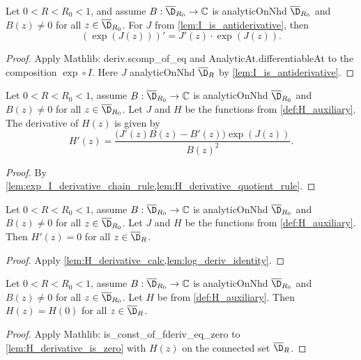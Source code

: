 \begin{lemma}\label{lem:exp_I_derivative_chain_rule}
\leanok
{}
Let $0<R<R_0<1$, and assume $B:\overline{\D}_{R_0}\to\mathbb{C}$ is analyticOnNhd $\overline{\D}_{R_0}$ and $B(z) \ne 0$ for all $z \in \overline{\D}_{R_0}$. For $J$ from \cref{lem:I_is_antiderivative}, then
\[ (\exp(J(z)))' = J'(z) \cdot \exp(J(z)). \]
\end{lemma}
\begin{proof}
\leanok
Apply Mathlib: deriv.scomp\_of\_eq and AnalyticAt.differentiableAt to the composition $\exp\circ I$. Here $J$ analyticOnNhd $\overline{\D}_{R}$ by \cref{lem:I_is_antiderivative}.
\end{proof}

\begin{lemma}[Derivative of $H(z)$]\label{lem:H_derivative_calc}
\leanok
{}
Let $0<R<R_0<1$, assume $B:\overline{\D}_{R_0}\to\mathbb{C}$ is analyticOnNhd $\overline{\D}_{R_0}$ and $B(z) \ne 0$ for all $z \in \overline{\D}_{R_0}$. Let $J$ and $H$ be the functions from \cref{def:H_auxiliary}. The derivative of $H(z)$ is given by
\[ H'(z) = \frac{\big(J'(z) B(z) - B'(z)\big)\exp(J(z))}{B(z)^2}. \]
\end{lemma}
\begin{proof}
\leanok
By \cref{lem:exp_I_derivative_chain_rule,lem:H_derivative_quotient_rule}.
\end{proof}



\begin{lemma}[Derivative of $H(z)$ is 0]\label{lem:H_derivative_is_zero}
\leanok
{}
Let $0<R<R_0<1$, assume $B:\overline{\D}_{R_0}\to\mathbb{C}$ is analyticOnNhd $\overline{\D}_{R_0}$ and $B(z) \ne 0$ for all $z \in \overline{\D}_{R_0}$. Let $J$ and $H$ be the functions from \cref{def:H_auxiliary}. Then $H'(z) = 0$ for all $z \in \overline{\D}_R$.
\end{lemma}
\begin{proof}
\leanok
Apply \cref{lem:H_derivative_calc,lem:log_deriv_identity}.
\end{proof}

\begin{lemma}[$H(z)$ is constant]\label{lem:H_is_constant}
\leanok
{}
Let $0<R<R_0<1$, assume $B:\overline{\D}_{R_0}\to\mathbb{C}$ is analyticOnNhd $\overline{\D}_{R_0}$ and $B(z) \ne 0$ for all $z \in \overline{\D}_{R_0}$. Let $H$ be from \cref{def:H_auxiliary}. Then $H(z)=H(0)$ for all $z\in\overline{\D}_R$.
\end{lemma}
\begin{proof}
\leanok
Apply Mathlib: is\_const\_of\_fderiv\_eq\_zero
to \cref{lem:H_derivative_is_zero} with $H(z)$ on the connected set $\overline{\D}_R$.
\end{proof}


